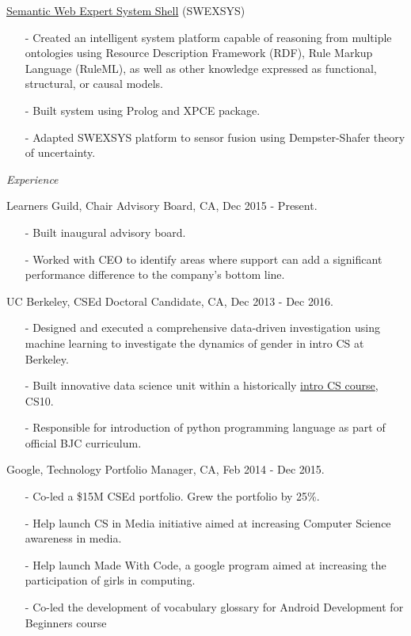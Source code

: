 \documentclass[11pt,article,oneside]{memoir}
\begin{document}
\ind \href{https://github.com/omoju/SWEXSYS}{Semantic Web Expert System Shell} (SWEXSYS)
\begin{itemize}[noitemsep,nolistsep]
\item[-] Created an intelligent system platform capable of reasoning from multiple ontologies using Resource Description Framework (RDF), Rule Markup Language (RuleML), as well as other knowledge expressed as functional, structural, or causal models.
\item[-] Built system using Prolog and XPCE package.
\item[-] Adapted SWEXSYS platform to sensor fusion using Dempster-Shafer theory of uncertainty.
\end{itemize} 

\bigskip 
  
\medskip

\noindent\emph{Experience \vspace{0.05in}}


\ind Learners Guild, Chair Advisory Board, CA, Dec 2015 - Present.
\begin{itemize}[noitemsep,nolistsep]
\item[-]Built inaugural advisory board.
\item[-]Worked with CEO to identify areas where support can add a significant performance difference to the company's bottom line.
\end{itemize} 

\ind UC Berkeley, CSEd Doctoral Candidate, CA, Dec 2013 - Dec 2016.
\begin{itemize}[noitemsep,nolistsep]
\item[-] Designed and executed a comprehensive data-driven investigation using machine learning to investigate the dynamics of gender in intro CS at Berkeley.
\item[-] Built innovative data science unit within a historically \href{http://www.whitehouse.gov/the-press-office/2014/12/08/fact-sheet-new-commitments-support-computer-science-education}{intro CS course}, CS10.
\item[-]Responsible for introduction of python programming language as part of official BJC curriculum.
\end{itemize} 

\ind Google, Technology Portfolio Manager, CA, Feb 2014 - Dec 2015. 
\begin{itemize}[noitemsep,nolistsep]
\item[-]Co-led a \$15M CSEd portfolio. Grew the portfolio by 25\%.
\item[-]Help launch CS in Media initiative aimed at increasing Computer Science awareness in media.
\item[-]Help launch Made With Code, a google program aimed at increasing the participation of girls in computing.
\item[-]Co-led the development of vocabulary glossary for Android Development for Beginners course
\end{itemize} 
\end{document}
